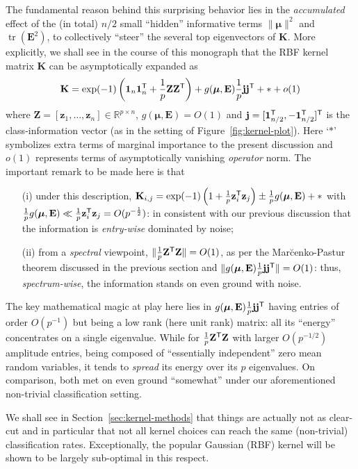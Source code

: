 \documentclass[MAL,biber]{nowfnt} %
\newcommand{\T}{{\sf T}}
\DeclareMathOperator{\tr}{tr}
\newcommand{\E}{{\mathbf{E}}}
\newcommand{\K}{{\mathbf{K}}}
\newcommand{\Z}{{\mathbf{Z}}}
\renewcommand{\j}{{\mathbf{j}}}
\newcommand{\z}{{\mathbf{z}}}
\newcommand{\bmu}{{ \boldsymbol{\mu} }}
\newcommand{\one}{{\mathbf{1}}}
\newcommand{\RR}{{\mathbb{R}}}
\begin{document}
The fundamental reason behind this surprising behavior lies in the \emph{accumulated} effect of the (in total) $n/2$ small ``hidden'' informative terms $\|\bmu\|^2$ and $\tr(\E^2)$, to collectively ``steer'' the several top eigenvectors of $\K$. More explicitly, we shall see in the course of this monograph that the RBF kernel matrix $\K$ can be asymptotically expanded as
\begin{align*}
    \K = \exp(-1) \left( \one_n \one_n^\T + \frac1p \Z\Z^\T \right) + g(\bmu,\E)\frac1p\j\j^\T + \ast + o(1)
\end{align*}
where $\Z=[\z_1,\ldots,\z_n]\in\RR^{p\times n}$, $g(\bmu,\E)=O(1)$ and $\j=[\one_{n/2}^\T,-\one_{n/2}^\T]^\T$ is the class-information vector (as in the setting of Figure~\ref{fig:kernel-plot}). Here `$\ast$' symbolizes extra terms of marginal importance to the present discussion and $o(1)$ represents terms of asymptotically vanishing \emph{operator} norm. The important remark to be made here is that
\begin{itemize}
    \item[(i)] under this description, $\K_{i,j}=\exp(-1)\left( 1 + \frac1p\z_i^\T\z_j \right)\pm \frac1pg(\bmu,\E)+\ast$ with $\frac1pg(\bmu,\E)\ll \frac1p\z_i^\T\z_j=O(p^{-\frac12})$: in consistent with our previous discussion that the information is \emph{entry-wise} dominated by noise;
    \item[(ii)] from a \emph{spectral} viewpoint, $\|\frac1p\Z^\T\Z\|=O(1)$, as per the Mar\u{c}enko-Pastur theorem \citep{marvcenko1967distribution} discussed in the previous section and $\|g(\bmu,\E)\frac1p\j\j^\T\|=O(1)$: thus, \emph{spectrum-wise}, the information stands on even ground with noise.
\end{itemize}
The key mathematical magic at play here lies in $g(\bmu,\E)\frac1p\j\j^\T$ having entries of order $O(p^{-1})$ but being a low rank (here unit rank) matrix: all its ``energy'' concentrates on a single eigenvalue. While for $\frac1p\Z^\T \Z$ with larger $O(p^{-1/2})$ amplitude entries, being composed of ``essentially independent'' zero mean random variables, it tends to \emph{spread} its energy over its $p$ eigenvalues. On comparison, both met on even ground ``somewhat'' under our aforementioned non-trivial classification setting. 

We shall see in Section~\ref{sec:kernel-methods} that things are actually not as clear-cut and in particular that not all kernel choices can reach the same (non-trivial) classification rates. Exceptionally, the popular Gaussian (RBF) kernel will be shown to be largely sub-optimal in this respect.
\end{document}
